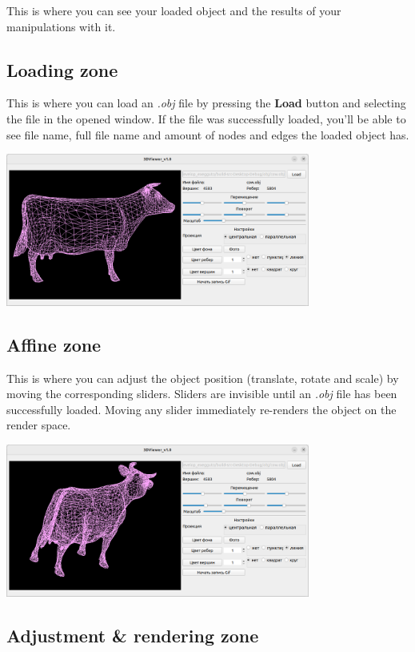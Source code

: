 \documentclass{article}
\begin{document}
This is where you can see your loaded object and the results of your manipulations with it.

\subsection{Loading zone}

This is where you can load an \textit{.obj} file by pressing the \textbf{Load} button and selecting the file in the opened window.
If the file was successfully loaded, you'll be able to see file name, full file name and amount of nodes and edges the loaded object has.

\includegraphics[width=10cm, keepaspectratio]{3dv_loading}

\subsection{Affine zone}

This is where you can adjust the object position (translate, rotate and scale) by moving the corresponding sliders.
Sliders are invisible until an \textit{.obj} file has been successfully loaded.
Moving any slider immediately re-renders the object on the render space.

\includegraphics[width=10cm, keepaspectratio]{3dv_affine}

\subsection{Adjustment \& rendering zone}
\end{document}
